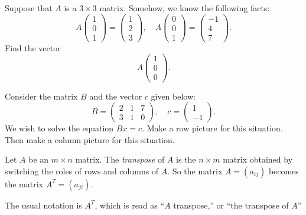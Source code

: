 \documentclass[cahier-main.tex]{subfiles}
\begin{document}
\begin{task}
Suppose that $A$ is a $3\times 3$ matrix. Somehow, we know the following facts:
\[
A\begin{pmatrix} 1 \\ 0 \\ 1 \end{pmatrix} = \begin{pmatrix} 1 \\2 \\3 \end{pmatrix},
 \quad A\begin{pmatrix} 0 \\ 0 \\ 1 \end{pmatrix} = \begin{pmatrix} -1 \\ 4 \\ 7 \end{pmatrix}. 
\]
Find the vector
\[
A \begin{pmatrix} 1 \\ 0 \\ 0 \end{pmatrix}.
\]

\end{task}

\begin{task}
Consider the matrix $B$ and the vector $c$ given below:
\[
B = \begin{pmatrix} 2 & 1 & 7 \\ 3 & 1 & 0 \end{pmatrix}, \quad c = \begin{pmatrix} 1 \\ -1 \end{pmatrix} .
\]
We wish to solve the equation $Bx=c$. Make a row picture for this situation. Then make a column picture for this situation.
\end{task}

\begin{definition} Let $A$ be an $m\times n$ matrix. The \emph{transpose} of $A$ is 
the $n\times m$ matrix obtained by switching the roles of rows and columns of $A$. So the matrix $A = (a_{ij})$ becomes the matrix $A^T = (a_{ji})$.

The usual notation is $A^T$, which is read as ``$A$ transpose,'' or ``the transpose of $A$''
\end{definition}
\end{document}
